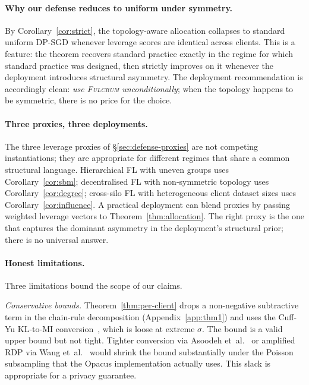 \documentclass[letterpaper,journal]{IEEEtran}
\newcommand{\Fulcrum}{\textsc{Fulcrum}\xspace}
\begin{document}
\paragraph{Why our defense reduces to uniform under symmetry.}
By Corollary~\ref{cor:strict}, the topology-aware allocation collapses
to standard uniform DP-SGD whenever leverage scores are identical
across clients. This is a feature: the theorem recovers standard
practice exactly in the regime for which standard practice was designed,
then strictly improves on it whenever the deployment introduces
structural asymmetry. The deployment recommendation is accordingly
clean: \emph{use \Fulcrum unconditionally}; when the topology happens
to be symmetric, there is no price for the choice.

\paragraph{Three proxies, three deployments.}
The three leverage proxies of \S\ref{sec:defense-proxies} are not
competing instantiations; they are appropriate for different regimes
that share a common structural language. Hierarchical FL with uneven
groups uses Corollary~\ref{cor:sbm}; decentralised FL with non-symmetric
topology uses Corollary~\ref{cor:degree}; cross-silo FL with
heterogeneous client dataset sizes uses
Corollary~\ref{cor:influence}. A practical deployment can blend
proxies by passing weighted leverage vectors to
Theorem~\ref{thm:allocation}. The right proxy is the one that captures
the dominant asymmetry in the deployment's structural prior; there is
no universal answer.

\paragraph{Honest limitations.}
Three limitations bound the scope of our claims.

\textit{Conservative bounds.}
Theorem~\ref{thm:per-client} drops a non-negative subtractive term in
the chain-rule decomposition (Appendix~\ref{app:thm1}) and uses the
Cuff-Yu KL-to-MI conversion~\cite{cuff2016mi}, which is loose at
extreme $\sigma$. The bound is a valid upper bound but not tight.
Tighter conversion via Asoodeh et~al.~\cite{asoodeh2021variants} or amplified
RDP via Wang et~al.~\cite{wang2019subsampled} would shrink the bound
substantially under the Poisson subsampling that the Opacus
implementation actually uses. This slack is appropriate for a privacy guarantee.
\end{document}
